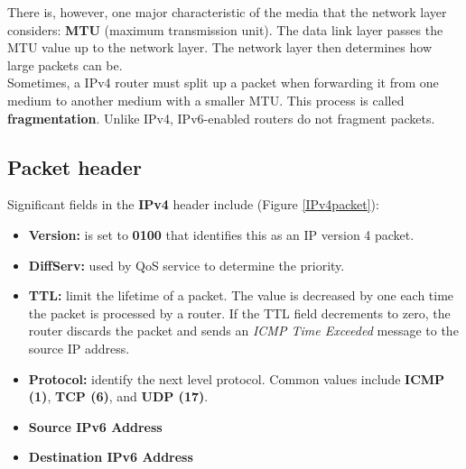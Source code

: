 There is, however, one major characteristic of the media that the network layer considers: \textbf{MTU} (maximum transmission unit). The data link layer passes the MTU value up to the network layer. The network layer then determines how large packets can be.\\

Sometimes, a IPv4 router must split up a packet when forwarding it from one medium to another medium with a smaller MTU. This process is called \textbf{fragmentation}. Unlike IPv4, IPv6-enabled routers do not fragment packets.

\subsection{Packet header}

Significant fields in the \textbf{IPv4} header include (Figure \ref{IPv4packet}):

\begin{itemize}
\item \textbf{Version:} is set to \textbf{0100} that identifies this as an IP version 4 packet.

\item \textbf{DiffServ:} used by QoS service to determine the priority.

\item \textbf{TTL:} limit the lifetime of a packet. The value is decreased by one each time the packet is processed by a router. If the TTL field decrements to zero, the router discards the packet and sends an \emph{ICMP Time Exceeded} message to the source IP address.

\item \textbf{Protocol:} identify the next level protocol. Common values include \textbf{ICMP (1)}, \textbf{TCP (6)}, and \textbf{UDP (17)}.

\item \textbf{Source IPv6 Address}

\item \textbf{Destination IPv6 Address}
\end{itemize}

